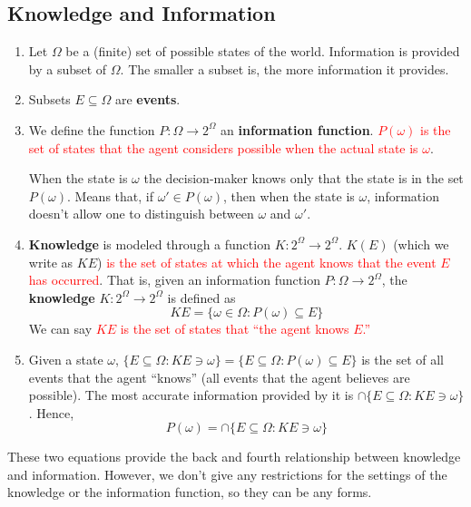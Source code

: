 \documentclass[11pt]{elegantbook}
\begin{document}
\subsection{Knowledge and Information}
\begin{enumerate}
    \item Let $\Omega$ be a (finite) set of possible states of the world. Information is provided by a subset of $\Omega$. The smaller a subset is, the more information it provides.
    \item Subsets $E\subseteq\Omega$ are \textbf{events}. %
    \item
    \begin{definition}
        \normalfont
        We define the function $P : \Omega \rightarrow 2^\Omega$ an \textbf{information function}. \textcolor{red}{$P(\omega)$ is the set of states that the agent considers possible when the actual state is $\omega$}.
    \end{definition}
    When the state is $\omega$ the decision-maker knows only that the state is in the set $P(\omega)$. Means that, if $\omega' \in P(\omega)$, then when the state is $\omega$, information doesn't allow one to distinguish between $\omega$ and $\omega'$.
    \item
    \begin{definition}[Knowledge]
        \normalfont
        \textbf{Knowledge} is modeled through a function $K:2^\Omega \rightarrow 2^\Omega$.
        $K(E)$ (which we write as $KE$) \textcolor{red}{is the set of states at which the agent knows that the event $E$ has occurred}.
        That is, given an information function $P: \Omega \rightarrow 2^\Omega$, the \textbf{knowledge} $K : 2^\Omega \rightarrow 2^\Omega$ is defined as $$KE=\{\omega\in\Omega:P(\omega)\subseteq E\}$$
        We can say \textcolor{red}{$KE$ is the set of states that ``the agent knows $E$.''}
    \end{definition}
    \item Given a state $\omega$, $\{E \subseteq \Omega : KE \ni \omega\}=\{E \subseteq \Omega : P(\omega)\subseteq E\}$ is the set of all events that the agent ``knows'' (all events that the agent believes are possible). The most accurate information provided by it is $\cap\{E \subseteq \Omega : KE \ni \omega\}$. Hence, $$P(\omega) = \cap\{E \subseteq \Omega : KE \ni \omega\}$$
\end{enumerate}
These two equations provide the back and fourth relationship between knowledge and information. However, we don't give any restrictions for the settings of the knowledge or the information function, so they can be any forms.
\end{document}
